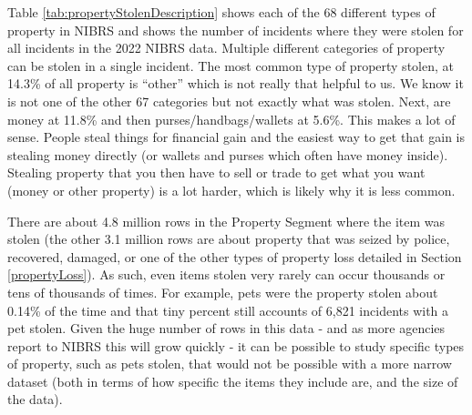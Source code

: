 \documentclass[
]{krantz}
\begin{document}
Table \ref{tab:propertyStolenDescription} shows each of the
68 different types of property in NIBRS and shows the number
of incidents where they were stolen for all incidents in the
2022 NIBRS data. Multiple different categories of property
can be stolen in a single incident. The most common type of
property stolen, at 14.3\% of all property is ``other''
which is not really that helpful to us. We know it is not
one of the other 67 categories but not exactly what was
stolen. Next, are money at 11.8\% and then
purses/handbags/wallets at 5.6\%. This makes a lot of sense.
People steal things for financial gain and the easiest way
to get that gain is stealing money directly (or wallets and
purses which often have money inside). Stealing property
that you then have to sell or trade to get what you want
(money or other property) is a lot harder, which is likely
why it is less common.

There are about 4.8 million rows in the Property Segment
where the item was stolen (the other 3.1 million rows are
about property that was seized by police, recovered,
damaged, or one of the other types of property loss detailed
in Section \ref{propertyLoss}). As such, even items stolen
very rarely can occur thousands or tens of thousands of
times. For example, pets were the property stolen about
0.14\% of the time and that tiny percent still accounts of
6,821 incidents with a pet stolen. Given the huge number of
rows in this data - and as more agencies report to NIBRS
this will grow quickly - it can be possible to study
specific types of property, such as pets stolen, that would
not be possible with a more narrow dataset (both in terms of
how specific the items they include are, and the size of the
data).
\end{document}
